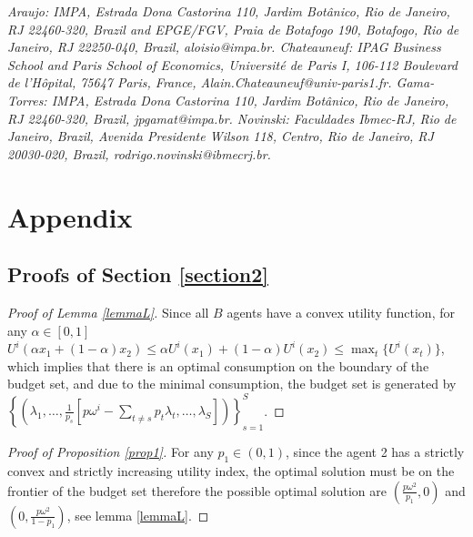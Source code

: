 \documentclass[pdftex]{article}
\numberwithin{equation}{section}
\theoremstyle{th}
\newtheorem{proof lemma}{{Proof Lemma}.}
\theoremstyle{definition}
\newtheorem*{risk lovers}{Risk lovers}
\newtheorem*{risk averse}{Risk averse}
\begin{document}
{\emph{Araujo: IMPA, Estrada Dona Castorina 110, Jardim Bot\^{a}nico, Rio de Janeiro, RJ 22460-320, Brazil and EPGE/FGV, Praia de Botafogo 190, Botafogo, Rio de Janeiro, RJ 22250-040, Brazil, aloisio@impa.br. Chateauneuf: IPAG Business School and Paris School of Economics, Universit\'{e} de Paris I, 106-112 Boulevard de l'H\^{o}pital, 75647 Paris, France, Alain.Chateauneuf@univ-paris1.fr. Gama-Torres: IMPA, Estrada Dona Castorina 110, Jardim Bot\^{a}nico, Rio de Janeiro, RJ 22460-320, Brazil, jpgamat@impa.br. Novinski: Faculdades Ibmec-RJ, Rio de Janeiro, Brazil, Avenida Presidente Wilson 118, Centro, Rio de Janeiro, RJ 20030-020, Brazil, rodrigo.novinski@ibmecrj.br.}

\appendix

\section{Appendix}
\subsection{Proofs of Section \ref{section2}}\label{appA1}

\label{prooflemmaL}
\begin{proof}[Proof of Lemma \ref{lemmaL}]
Since all $B$ agents have a convex utility function, for any $\alpha\in[0,1]$ $U^i(\alpha{x}_1+(1-\alpha)x_2)\leq\alpha{U}^i(x_1)+(1-\alpha)U^i(x_2)\leq\max_t\{U^i(x_t)\}$, which implies that there is an optimal consumption on the boundary of the budget set, and due to the minimal consumption, the budget set is generated by $\left\{\left(\lambda_1,\dots,\frac{1}{p_s}\left[p\omega^i-\sum_{t\neq{s}}p_t\lambda_t,\dots,\lambda_S\right]\right)\right\}_{s=1}^S$.
\end{proof}


\begin{proof}[Proof of Proposition \ref{prop1}]
For any $p_1\in(0,1)$, since the agent 2 has a strictly convex and strictly increasing utility index, the optimal solution must be on the frontier of the budget set therefore the possible optimal solution are $\left(\frac{p\omega^{2}}{p_1},0\right)$ and $\left(0,\frac{p\omega^{2}}{1-p_1}\right)$, see lemma \ref{lemmaL}.


\end{proof}}
\end{document}
